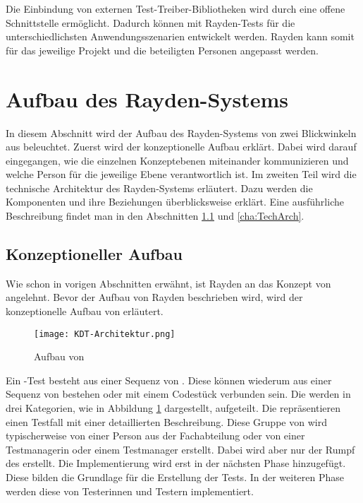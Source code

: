 \SuperPar
Die Einbindung von externen Test-Treiber-Bibliotheken wird durch eine offene Schnittstelle ermöglicht. Dadurch können mit Rayden-Tests für die unterschiedlichsten Anwendungsszenarien entwickelt werden. Rayden kann somit für das jeweilige Projekt und die beteiligten Personen angepasst werden. 


\section{Aufbau des Rayden-Systems}

In diesem Abschnitt wird der Aufbau des Rayden-Systems von zwei Blickwinkeln aus beleuchtet. Zuerst wird der konzeptionelle Aufbau erklärt. Dabei wird darauf eingegangen, wie die einzelnen Konzeptebenen miteinander kommunizieren und welche Person für die jeweilige Ebene verantwortlich ist. Im zweiten Teil wird die technische Architektur des Rayden-Systems erläutert. Dazu werden die Komponenten und ihre Beziehungen überblicksweise erklärt. Eine ausführliche Beschreibung findet man in den Abschnitten \ref{cha:KonzeptAufbau} und \ref{cha:TechArch}.

\subsection{Konzeptioneller Aufbau}
\label{cha:KonzeptAufbau}

Wie schon in vorigen Abschnitten erwähnt, ist Rayden an das Konzept von  angelehnt. Bevor der Aufbau von Rayden beschrieben wird, wird der konzeptionelle Aufbau von  erläutert. 

\begin{figure}[h]
\centering
\texttt{[image: KDT-Architektur.png]}
\caption{Aufbau von }
\label{fig:kdt-arch}
\end{figure}

\SuperPar
Ein -Test besteht aus einer Sequenz von . Diese  können wiederum aus einer Sequenz von  bestehen oder mit einem Codestück verbunden sein. Die  werden in drei Kategorien, wie in Abbildung \ref{fig:kdt-arch} dargestellt, aufgeteilt. Die  repräsentieren einen Testfall mit einer detaillierten Beschreibung. Diese Gruppe von  wird typischerweise von einer Person aus der Fachabteilung oder von einer Testmanagerin oder einem Testmanager erstellt. Dabei wird aber nur der Rumpf des  erstellt. Die Implementierung wird erst in der nächsten Phase hinzugefügt. Diese  bilden die Grundlage für die Erstellung der Tests. In der weiteren Phase werden diese  von Testerinnen und Testern implementiert.

